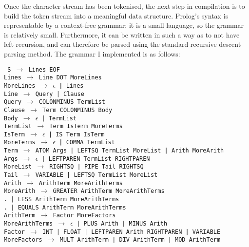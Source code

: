 \documentclass[12pt]{article}
\begin{document}
Once the character stream has been tokenised, the next step in compilation is to build the token stream into a meaningful data structure. 
Prolog's syntax is representable by a context-free grammar: it is a small language, so the grammar is relatively small. 
Furthermore, it can be written in such a way as to not have left recursion, and can therefore be parsed using the standard recursive descent parsing method. 
The grammar I implemented is as follows:

\newpage

\texttt{
S $\rightarrow$ Lines EOF\\
Lines $\rightarrow$ Line DOT MoreLines\\
MoreLines $\rightarrow$ $\epsilon$ | Lines\\
Line $\rightarrow$ Query | Clause\\
Query $\rightarrow$ COLONMINUS TermList\\
Clause $\rightarrow$ Term COLONMINUS Body\\
Body $\rightarrow$ $\epsilon$ | TermList\\
TermList $\rightarrow$ Term IsTerm MoreTerms\\
IsTerm $\rightarrow$ $\epsilon$ | IS Term IsTerm\\
MoreTerms $\rightarrow$ $\epsilon$ | COMMA TermList\\
Term $\rightarrow$ ATOM Args | LEFTSQ TermList MoreList | Arith MoreArith\\
Args $\rightarrow$ $\epsilon$ | LEFTPAREN TermList RIGHTPAREN\\
MoreList $\rightarrow$ RIGHTSQ | PIPE Tail RIGHTSQ\\
Tail $\rightarrow$ VARIABLE | LEFTSQ TermList MoreList\\
Arith $\rightarrow$ ArithTerm MoreArithTerms\\
MoreArith $\rightarrow$ GREATER ArithTerm MoreArithTerms\\
.\hspace{50px} | LESS ArithTerm MoreArithTerms \\
.\hspace{50px} | EQUALS ArithTerm MoreArithTerms\\
ArithTerm $\rightarrow$ Factor MoreFactors\\
MoreArithTerms $\rightarrow$ $\epsilon$ | PLUS Arith | MINUS Arith\\
Factor $\rightarrow$ INT | FLOAT | LEFTPAREN Arith RIGHTPAREN | VARIABLE\\
MoreFactors $\rightarrow$ MULT ArithTerm | DIV ArithTerm | MOD ArithTerm
}
\end{document}
